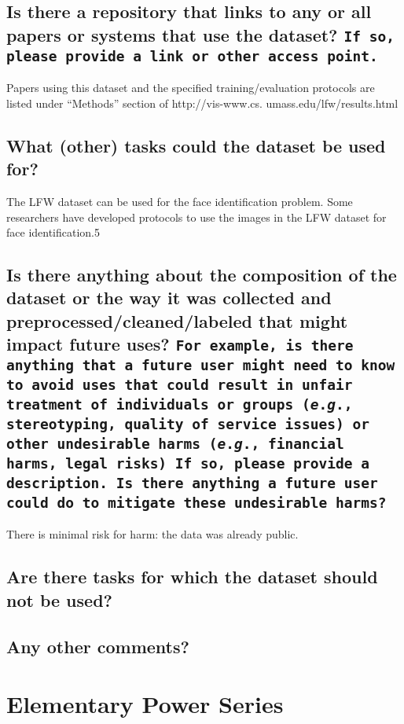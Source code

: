 \documentclass[a4paper,9pt]{extarticle}
\newcommand{\eg}{\textit{e}.\textit{g}., }
\begin{document}
\begin{multicols}{2}
\subsection*{Is there a repository that links to any or all papers or systems that use the dataset? \texttt{If so, please provide a link or other access point.}}
Papers using this dataset and the specified training/evaluation
protocols are listed under “Methods” section of http://vis-www.cs.
umass.edu/lfw/results.html
\subsection*{What (other) tasks could the dataset be used for?}
The LFW dataset can be used for the face identification problem.
Some researchers have developed protocols to use the images in
the LFW dataset for face identification.5
\subsection*{Is there anything about the composition of the dataset or the way it was collected and preprocessed/cleaned/labeled that might impact
future uses? \texttt{For example, is there anything that a future user might need to know to avoid uses that could result in unfair treatment of individuals or groups (\eg stereotyping, quality of service issues) or other undesirable harms (\eg financial harms, legal risks) If so, please provide a description. Is there anything a future user could do to mitigate these undesirable harms?}}

There is minimal risk for harm: the data was already public.
\subsection*{Are there tasks for which the dataset should not be used?}
\subsection*{Any other comments?}


\end{multicols}



\section*{Elementary Power Series}
\end{document}
